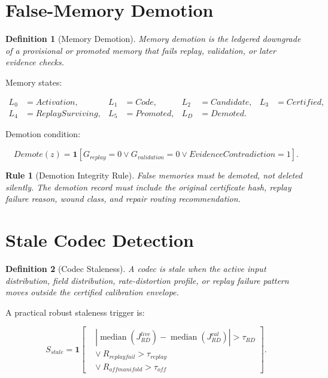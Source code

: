 \documentclass[12pt]{article}
\newtheorem{definition}{Definition}
\newtheorem{rulebox}{Rule}
\begin{document}
\section{False-Memory Demotion}

\begin{definition}[Memory Demotion]
Memory demotion is the ledgered downgrade of a provisional or promoted memory
that fails replay, validation, or later evidence checks.
\end{definition}

Memory states:

\[
\begin{aligned}
L_0&=Activation, & L_1&=Code, & L_2&=Candidate, & L_3&=Certified,\\
L_4&=ReplaySurviving, & L_5&=Promoted, & L_D&=Demoted.
\end{aligned}
\]

Demotion condition:

\[
Demote(z)=\mathbf{1}
\left[
G_{replay}=0\vee G_{validation}=0\vee EvidenceContradiction=1
\right].
\]

\begin{rulebox}[Demotion Integrity Rule]
False memories must be demoted, not deleted silently. The demotion record must
include the original certificate hash, replay failure reason, wound class, and
repair routing recommendation.
\end{rulebox}

\section{Stale Codec Detection}

\begin{definition}[Codec Staleness]
A codec is stale when the active input distribution, field distribution,
rate-distortion profile, or replay failure pattern moves outside the certified
calibration envelope.
\end{definition}

A practical robust staleness trigger is:

\[
S_{stale}=\mathbf{1}
\left[
\begin{aligned}
&|\operatorname{median}(J_{RD}^{live})-\operatorname{median}(J_{RD}^{cal})|>\tau_{RD}\\
&\vee\ R_{replayfail}>\tau_{replay}\\
&\vee\ R_{offmanifold}>\tau_{off}
\end{aligned}
\right].
\]
\end{document}
